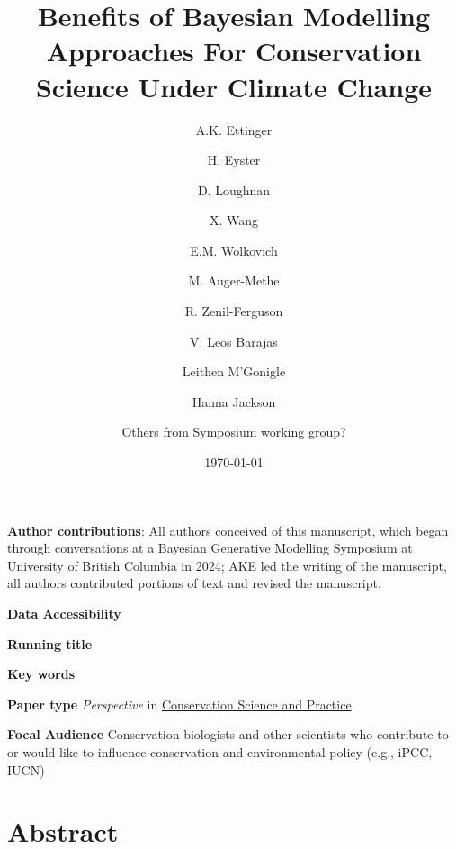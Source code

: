 \documentclass{article}
\begin{document}



\title{Benefits of Bayesian Modelling Approaches For Conservation Science Under Climate Change} 
\author[1,a]{A.K. Ettinger}
\author[2]{H. Eyster}
\author[3]{D. Loughnan}
\author[3]{X. Wang}
\author[3]{E.M. Wolkovich}
\author[3]{M. Auger-Methe}
\author[4]{R. Zenil-Ferguson}
\author[5]{V. Leos Barajas}
\author[6]{Leithen M'Gonigle}
\author[6]{Hanna Jackson}
\author[7]{Others from Symposium working group?}





\date{\today}
\maketitle 
\textbf{Author contributions}: All authors conceived of this manuscript, which began through conversations at a Bayesian Generative Modelling Symposium at University of British Columbia in 2024; AKE led the writing of the manuscript, all authors contributed portions of text and revised the manuscript.

\textbf{Data Accessibility} 

\textbf{Running title} 

\textbf{Key words} 


\textbf{Paper type} \textit{Perspective} in \href{https://conbio.onlinelibrary.wiley.com/hub/journal/25784854/homepage/author-guidelines}{Conservation Science and Practice} 

\textbf{Focal Audience} Conservation biologists and other scientists who contribute to or would like to influence conservation and environmental policy (e.g., iPCC, IUCN)




\section*{Abstract} 
\end{document}
